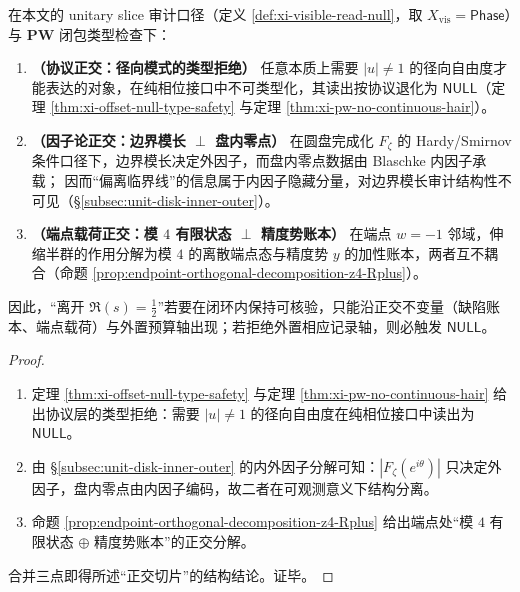 \begin{theorem}\label{thm:xi-orthogonal-slice-structure}
在本文的 unitary slice 审计口径（定义 \ref{def:xi-visible-read-null}，取 \(X_{\mathrm{vis}}=\mathsf{Phase}\)）与 \(\mathbf{PW}\) 闭包类型检查下：
\begin{enumerate}
  \item \textbf{（协议正交：径向模式的类型拒绝）}
  任意本质上需要 \(|u|\neq 1\) 的径向自由度才能表达的对象，在纯相位接口中不可类型化，其读出按协议退化为 \(\mathsf{NULL}\)（定理 \ref{thm:xi-offset-null-type-safety} 与定理 \ref{thm:xi-pw-no-continuous-hair}）。
  \item \textbf{（因子论正交：边界模长 \(\perp\) 盘内零点）}
  在圆盘完成化 \(F_\zeta\) 的 Hardy/Smirnov 条件口径下，边界模长决定外因子，而盘内零点数据由 Blaschke 内因子承载；
  因而“偏离临界线”的信息属于内因子隐藏分量，对边界模长审计结构性不可见（\S\ref{subsec:unit-disk-inner-outer}）。
  \item \textbf{（端点载荷正交：模 \(4\) 有限状态 \(\perp\) 精度势账本）}
  在端点 \(w=-1\) 邻域，伸缩半群的作用分解为模 \(4\) 的离散端点态与精度势 \(y\) 的加性账本，两者互不耦合（命题 \ref{prop:endpoint-orthogonal-decomposition-z4-Rplus}）。
\end{enumerate}
因此，“离开 \(\Re(s)=\tfrac12\)”若要在闭环内保持可核验，只能沿正交不变量（缺陷账本、端点载荷）与外置预算轴出现；若拒绝外置相应记录轴，则必触发 \(\mathsf{NULL}\)。
\end{theorem}
\begin{proof}
\begin{enumerate}
  \item
  定理 \ref{thm:xi-offset-null-type-safety} 与定理 \ref{thm:xi-pw-no-continuous-hair} 给出协议层的类型拒绝：需要 \(|u|\neq 1\) 的径向自由度在纯相位接口中读出为 \(\mathsf{NULL}\)。
  \item
  由 \S\ref{subsec:unit-disk-inner-outer} 的内外因子分解可知：\(|F_\zeta(e^{i\theta})|\) 只决定外因子，盘内零点由内因子编码，故二者在可观测意义下结构分离。
  \item
  命题 \ref{prop:endpoint-orthogonal-decomposition-z4-Rplus} 给出端点处“模 \(4\) 有限状态 \(\oplus\) 精度势账本”的正交分解。
\end{enumerate}
合并三点即得所述“正交切片”的结构结论。证毕。
\end{proof}

